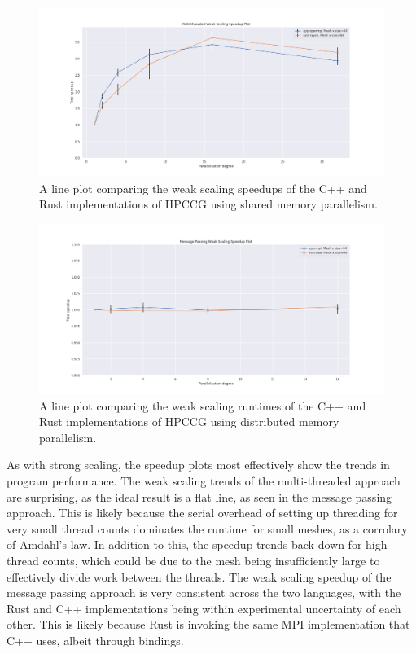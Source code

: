 \begin{figure}[H]
    \centering
    \includegraphics[width=\textwidth]{images/5_performance/scaling/weak_scaling_speedup_threaded.png}
    \caption{A line plot comparing the weak scaling speedups of the C++ and Rust implementations of HPCCG using shared memory parallelism.}
    \label{fig:weak_scaling_speedup_threaded}
\end{figure}

\begin{figure}[H]
    \centering
    \includegraphics[width=\textwidth]{images/5_performance/scaling/weak_scaling_speedup_mpi.png}
    \caption{A line plot comparing the weak scaling runtimes of the C++ and Rust implementations of HPCCG using distributed memory parallelism.}
    \label{fig:weak_scaling_speedup_mpi}
\end{figure}

As with strong scaling, the speedup plots most effectively show the trends in program performance. The weak scaling trends of the multi-threaded approach are surprising, as the ideal result is a flat line, as seen in the message passing approach. This is likely because the serial overhead of setting up threading for very small thread counts dominates the runtime for small meshes, as a corrolary of Amdahl's law. In addition to this, the speedup trends back down for high thread counts, which could be due to the mesh being insufficiently large to effectively divide work between the threads. The weak scaling speedup of the message passing approach is very consistent across the two languages, with the Rust and C++ implementations being within experimental uncertainty of each other. This is likely because Rust is invoking the same MPI implementation that C++ uses, albeit through bindings.

